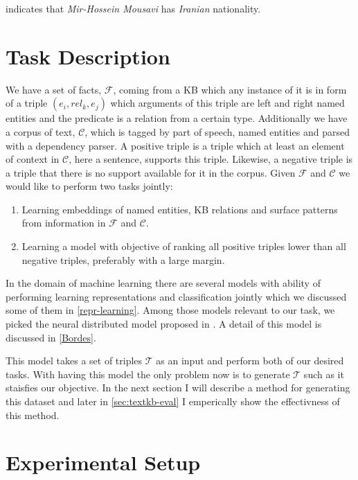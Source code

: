 indicates that \textit{Mir-Hossein Mousavi} has \textit{Iranian} nationality.

\section{Task Description}
\label{sec:textkb-task}

We have a set of facts, $\mathcal{F}$, coming from a KB which any instance of it
is in form of a triple $(e_{i}, rel_{k}, e_{j})$ which arguments of this triple are
left and right named entities and the predicate is a relation from a certain
type. Additionally we have a corpus of text, $\mathcal{C}$, which is tagged by
part of speech, named entities and parsed with a dependency parser.
A positive triple is a triple which at least an element of context in
$\mathcal{C}$, here a sentence, supports this triple. Likewise, a negative
triple is a triple that there is no support available for it in the corpus.
Given $\mathcal{F}$ and $\mathcal{C}$ we would like to perform two tasks
jointly:

\begin{enumerate}
  \item Learning embeddings of named entities, KB relations and surface patterns
  from information in $\mathcal{F}$ and $\mathcal{C}$.
  \item Learning a model with objective of ranking all positive triples lower
  than all negative triples, preferably with a large margin.
\end{enumerate}

In the domain of machine learning there are several models with ability of
performing learning representations and classification jointly which we
discussed some of them in \autoref{repr-learning}. Among those models relevant
to our task, we picked the neural distributed model proposed in \cite{Bordes2012}.
A detail of this model is discussed in \autoref{Bordes}.

This model takes a set of triples $\mathcal{T}$ as an input and perform both of
our desired tasks. With having this model the only problem now is to generate 
$\mathcal{T}$ such as it staisfies our objective. In the next section I will
describe a method for generating this dataset and later in
\autoref{sec:textkb-eval} I emperically show the effectivness of this method.

\section{Experimental Setup}
\label{sec:textkb-exp}

